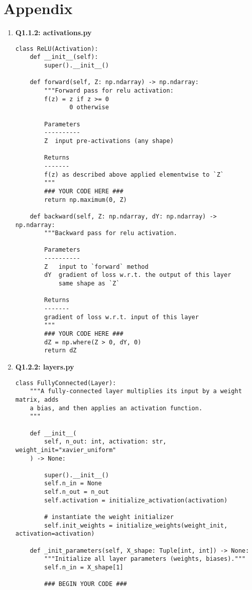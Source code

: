 \documentclass{article}
\newcommand{\Question}[1]{\Large \section{ #1 } \normalsize}
\begin{document}
\newpage
\Question{Appendix}
\begin{enumerate}
    \item 
     \textbf{Q1.1.2: activations.py}

\begin{verbatim}
class ReLU(Activation):
    def __init__(self):
        super().__init__()

    def forward(self, Z: np.ndarray) -> np.ndarray:
        """Forward pass for relu activation:
        f(z) = z if z >= 0
               0 otherwise
        
        Parameters
        ----------
        Z  input pre-activations (any shape)

        Returns
        -------
        f(z) as described above applied elementwise to `Z`
        """
        ### YOUR CODE HERE ###
        return np.maximum(0, Z)

    def backward(self, Z: np.ndarray, dY: np.ndarray) -> np.ndarray:
        """Backward pass for relu activation.
        
        Parameters
        ----------
        Z   input to `forward` method
        dY  gradient of loss w.r.t. the output of this layer
            same shape as `Z`

        Returns
        -------
        gradient of loss w.r.t. input of this layer
        """
        ### YOUR CODE HERE ###
        dZ = np.where(Z > 0, dY, 0)
        return dZ
\end{verbatim}\newpage
    \item 
     \textbf{Q1.2.2: layers.py}
\begin{verbatim}
class FullyConnected(Layer):
    """A fully-connected layer multiplies its input by a weight matrix, adds
    a bias, and then applies an activation function.
    """

    def __init__(
        self, n_out: int, activation: str, weight_init="xavier_uniform"
    ) -> None:

        super().__init__()
        self.n_in = None
        self.n_out = n_out
        self.activation = initialize_activation(activation)

        # instantiate the weight initializer
        self.init_weights = initialize_weights(weight_init, activation=activation)

    def _init_parameters(self, X_shape: Tuple[int, int]) -> None:
        """Initialize all layer parameters (weights, biases)."""
        self.n_in = X_shape[1]

        ### BEGIN YOUR CODE ###


\end{verbatim}
\end{enumerate}
\end{document}
